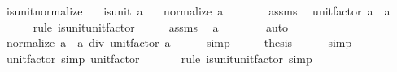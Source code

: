 \begin{isabellebody}
\ is{\isacharunderscore}{\kern0pt}unit{\isacharunderscore}{\kern0pt}normalize{\isacharcolon}{\kern0pt}\isanewline
\ \ \ {\isachardoublequoteopen}is{\isacharunderscore}{\kern0pt}unit\ a{\isachardoublequoteclose}\isanewline
\ \ \ {\isachardoublequoteopen}normalize\ a\ {\isacharequal}{\kern0pt}\ {}{\isachardoublequoteclose}\isanewline
%
\isadelimproof
%
\endisadelimproof
%
\isatagproof
{}\isamarkupfalse%
\ {\isacharminus}{\kern0pt}\isanewline
\ \ \isamarkupfalse%
\ assms\ \isamarkupfalse%
\ {\isachardoublequoteopen}unit{\isacharunderscore}{\kern0pt}factor\ a\ {\isacharequal}{\kern0pt}\ a{\isachardoublequoteclose}\isanewline
\ \ \ \ \isamarkupfalse%
\ {\isacharparenleft}{\kern0pt}rule\ is{\isacharunderscore}{\kern0pt}unit{\isacharunderscore}{\kern0pt}unit{\isacharunderscore}{\kern0pt}factor{\isacharparenright}{\kern0pt}\isanewline
\ \ \isamarkupfalse%
\ \isamarkupfalse%
\ assms\ \isamarkupfalse%
\ {\isachardoublequoteopen}a\ {\isasymnoteq}\ {}{\isachardoublequoteclose}\isanewline
\ \ \ \ \isamarkupfalse%
\ auto\isanewline
\ \ \isamarkupfalse%
\ \isamarkupfalse%
\ {\isachardoublequoteopen}normalize\ a\ {\isacharequal}{\kern0pt}\ a\ div\ unit{\isacharunderscore}{\kern0pt}factor\ a{\isachardoublequoteclose}\isanewline
\ \ \ \ \isamarkupfalse%
\ simp\isanewline
\ \ \isamarkupfalse%
\ \isamarkupfalse%
\ {\isacharquery}{\kern0pt}thesis\isanewline
\ \ \ \ \isamarkupfalse%
\ simp\isanewline
{}\isamarkupfalse%
%
\endisatagproof
{\isafoldproof}%
%
\isadelimproof
\isanewline
%
\endisadelimproof
\isanewline
{}\isamarkupfalse%
\ unit{\isacharunderscore}{\kern0pt}factor{\isacharunderscore}{\kern0pt}{}\ {\isacharbrackleft}{\kern0pt}simp{\isacharbrackright}{\kern0pt}{\isacharcolon}{\kern0pt}\ {\isachardoublequoteopen}unit{\isacharunderscore}{\kern0pt}factor\ {}\ {\isacharequal}{\kern0pt}\ {}{\isachardoublequoteclose}\isanewline
%
\isadelimproof
\ \ %
\endisadelimproof
%
\isatagproof
{}\isamarkupfalse%
\ {\isacharparenleft}{\kern0pt}rule\ is{\isacharunderscore}{\kern0pt}unit{\isacharunderscore}{\kern0pt}unit{\isacharunderscore}{\kern0pt}factor{\isacharparenright}{\kern0pt}\ simp%
\endisatagproof
{\isafoldproof}%
%
\isadelimproof
\isanewline
%
\endisadelimproof
\isanewline
{}\isamarkupfalse%

\end{isabellebody}
